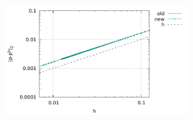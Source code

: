 \begin{center}
\includegraphics[width=8cm]{python_codes/fieldstone_176/results/errp.pdf}
\end{center}
